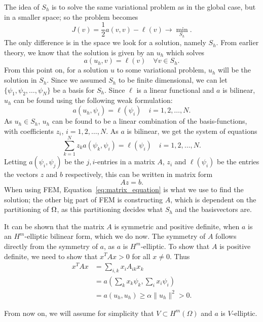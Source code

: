 The idea of $S_h$ is to solve the same variational problem as in the global case, 
but in a smaller space; so the problem becomes
\begin{equation*}
    J(v) = \frac{1}{2}a(v,v) - \ell(v) \to \underset{S_h}{\min}.
\end{equation*}
The only difference is in the space we look for a solution, namely $S_h$. From 
earlier theory, we know that the solution is given by an $u_h$ which solves
\begin{equation*}
    a(u_h,v) = \ell(v) \quad \forall v \in S_h.
\end{equation*}
From this point on, for a solution $u$ to some variational problem, $u_h$ will be the solution in $S_h$.
Since we assumed $S_h$ to be finite dimensional, we can let $ \{ \psi_1, \psi_2, \ldots, \psi_N \}$ 
be a basis for $S_h$. Since $\ell$ is a linear functional and $a$ is bilinear, 
$u_h$ can be found using the following weak formulation:
\begin{equation*}
    a(u_h, \psi_i) = \ell(\psi_i) \quad i = 1, 2, \ldots, N.
\end{equation*}
As $u_h \in S_h$, $u_h$ can be found to be a linear combination of the basis-functions, with 
coefficients $z_i$, $i=1, 2, \ldots, N$. As $a$ is bilinear, we get the system of 
equations
\begin{equation*}
    \sum_{k=1}^N z_k a(\psi_k,\psi_i) = \ell(\psi_i) \quad i = 1,2,\ldots,N.
\end{equation*}
Letting $a(\psi_i,\psi_j)$ be the $j,i$-entries in a matrix $A$, $z_i$ and $\ell(\psi_i)$ 
be the entries the vectors $z$ and $b$ respectively, this can be written in matrix form 
\begin{equation}
    Az = b. \label{eq:matrix_equation}
\end{equation}
When using FEM, Equation~\eqref{eq:matrix_equation} is what we use to find the solution; 
the other big part of FEM is constructing $A$, which is dependent on the partitioning of $\Omega$, 
as this partitioning decides what $S_h$ and the basisvectors are.

It can be shown that the matrix $A$ is symmetric and positive definite, when $a$ is an $H^m$-elliptic bilinear form, which we do now. 
The symmetry of $A$ follows directly from the symmetry of $a$, as $a$ is $H^m$-elliptic.
To show that $A$ is positive definite, we need to show that $x^T Ax > 0$ for all $x \neq 0$. Thus
\begin{align*}
    x^T Ax &= \sum_{i,k} x_i A_{ik}x_k \\
    &= a\left(\sum_{k} x_k\psi_k,\sum_{i} x_i\psi_i\right) \\
    &= a(u_h,u_h) \geq \alpha \|u_h\|^2 > 0.
\end{align*}

From now on, we will assume for simplicity that $V\subset H^m(\Omega)$ and $a$ is $V$-elliptic.

